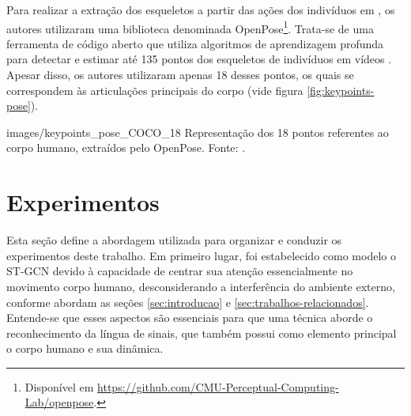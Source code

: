Para realizar a extração dos esqueletos a partir das ações dos indivíduos em \cite{st-gcn-2018}, os autores utilizaram uma biblioteca denominada OpenPose\footnote{
    Disponível em \url{https://github.com/CMU-Perceptual-Computing-Lab/openpose}.
}. Trata-se de uma ferramenta de código aberto que utiliza algoritmos de aprendizagem profunda para detectar e estimar até 135 pontos dos esqueletos de indivíduos em vídeos \cite{cao-realtime-2017, simon-hand-2017, wei-cpm-2016}. Apesar disso, os autores utilizaram apenas 18 desses pontos, os quais se correspondem às articulações principais do corpo (vide figura \ref{fig:keypoints-pose}). 

    {images/keypoints_pose_COCO_18}
    {Representação dos 18 pontos referentes ao corpo humano, extraídos pelo OpenPose. Fonte: \cite{openpose-output-2018}.}



\section{Experimentos} %
\label{sec:experimentos}

Esta seção define a abordagem utilizada para organizar e conduzir os experimentos deste trabalho. Em primeiro lugar, foi estabelecido como modelo o ST-GCN devido à capacidade de centrar sua atenção essencialmente no movimento corpo humano, desconsiderando a interferência do ambiente externo, conforme abordam as seções \ref{sec:introducao} e \ref{sec:trabalhos-relacionados}. Entende-se que esses aspectos são essenciais para que uma técnica aborde o reconhecimento da língua de sinais, que também possui como elemento principal o corpo humano e sua dinâmica.


